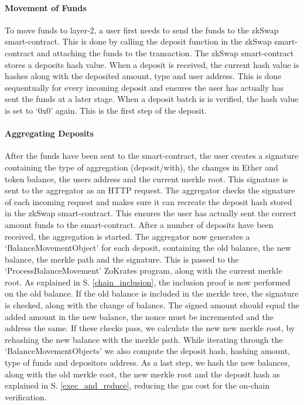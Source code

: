\documentclass[../../thesis.tex]{subfiles}
\begin{document}
\paragraph{Movement of Funds}
To move funds to layer-2, a user first needs to send the funds to the zkSwap smart-contract. This is done by calling the deposit function in the zkSwap smart-contract and attaching the funds to the transaction. The zkSwap smart-contract stores a deposits hash value. When a deposit is received, the current hash value is hashes along with the deposited amount, type and user address. This is done sequentually for every incoming deposit and ensures the user has actually has sent the funds at a later stage. When a deposit batch is is verified, the hash value is set to `0x0' again. This is the first step of the deposit.

\paragraph{Aggregating Deposits} \label{aggr_deps}
After the funds have been sent to the smart-contract, the user creates a signature containing the type of aggregation (deposit/with), the changes in Ether and token balance, the users address and the current merkle root. This signature is sent to the aggregator as an HTTP request. The aggregator checks the signature of each incoming request and makes sure it can recreate the deposit hash stored in the zkSwap smart-contract. This ensures the user has actually sent the correct amount funds to the smart-contract. After a number of deposits have been received, the aggregation is started. The aggregator now generates a `BalanceMovementObject' for each deposit, containing the old balance, the new balance, the merkle path and the signature. This is passed to the `ProcessBalanceMovement' ZoKrates program, along with the current merkle root. As explained in S. \ref{chain_inclusion}, the inclusion proof is now performed on the old balance. If the old balance is included in the merkle tree, the signature is checked, along with the change of balance. The signed amount should equal the added amount in the new balance, the nonce must be incremented and the address the same. If these checks pass, we calculate the new new merkle root, by rehashing the new balance with the merkle path. While iterating through the `BalanceMovementObjects' we also compute the deposit hash, hashing amount, type of funds and depositors address. As a last step, we hash the new balances, along with the old merkle root, the new merkle root and the deposit hash as explained in S. \ref{exec_and_reduce}, reducing the gas cost for the on-chain verification. 
\end{document}
